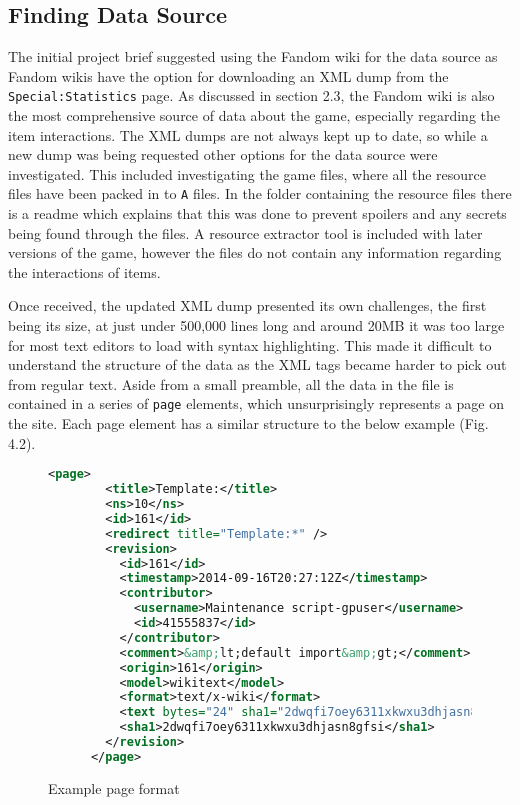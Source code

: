 \subsection{Finding Data Source}
The initial project brief suggested using the Fandom wiki for the data source as Fandom wikis have the option for downloading 
an XML dump from the \verb|Special:Statistics| page. As discussed in section 2.3, the Fandom wiki is also the most comprehensive 
source of data about the game, especially regarding the item interactions. The XML dumps are not always kept up to date, so while 
a new dump was being requested other options for the data source were investigated. This included investigating the game files, where 
all the resource files have been packed in to \verb|A| files. In the folder containing the resource files there is a readme which explains 
that this was done to prevent spoilers and any secrets being found through the files. A resource extractor tool is included with later versions of the game, 
however the files do not contain any information regarding the interactions of items.\par
Once received, the updated XML dump presented its own challenges, the first being its size, at just under 500,000 lines long and around 20MB it was too 
large for most text editors to load with syntax highlighting. This made it difficult to understand the structure of the data as the XML tags became harder 
to pick out from regular text. Aside from a small preamble, all the data in the file is contained in a series of \verb|page| elements, which unsurprisingly represents a page on the site.
Each page element has a similar structure to the below example (Fig. 4.2).
\begin{figure}[!htbp]
    \begin{lstlisting}[language=XML]
        <page>
        <title>Template:</title>
        <ns>10</ns>
        <id>161</id>
        <redirect title="Template:*" />
        <revision>
          <id>161</id>
          <timestamp>2014-09-16T20:27:12Z</timestamp>
          <contributor>
            <username>Maintenance script-gpuser</username>
            <id>41555837</id>
          </contributor>
          <comment>&amp;lt;default import&amp;gt;</comment>
          <origin>161</origin>
          <model>wikitext</model>
          <format>text/x-wiki</format>
          <text bytes="24" sha1="2dwqfi7oey6311xkwxu3dhjasn8gfsi" xml:space="preserve">#redirect [[Template:*]]</text>
          <sha1>2dwqfi7oey6311xkwxu3dhjasn8gfsi</sha1>
        </revision>
      </page>
    \end{lstlisting}
    \caption{Example page format}
\end{figure}

